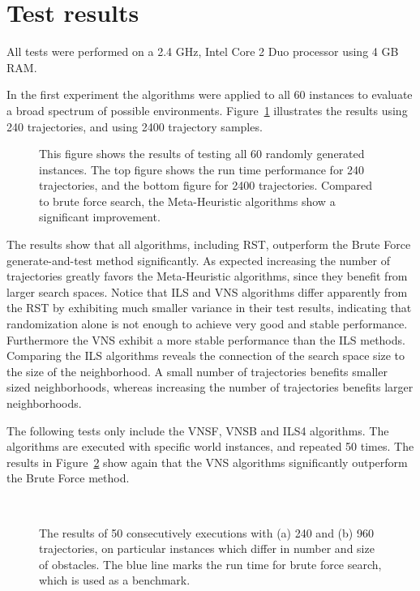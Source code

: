 \section{Test results}\label{sec:testresults}
All tests were performed on a 2.4 GHz, Intel Core 2 Duo processor using 4 GB RAM. 

In the first experiment the algorithms were applied to all 60 instances to evaluate a broad spectrum of possible environments. 
Figure~\ref{fig:fig_allworlds} illustrates the results using 240 trajectories, and using 2400 trajectory samples.
   \begin{figure}[thpb]
        \footnotesize
      \centering
      \def\svgwidth{0.7\textwidth}
      
      \caption{This figure shows the results of testing all 60 randomly generated instances. The top figure shows the run time performance for 240 trajectories, and the bottom figure for 2400 trajectories. Compared to brute force search, the Meta-Heuristic algorithms show a significant improvement. }
      \label{fig:fig_allworlds}
   \end{figure}

 
The results show that all algorithms, including RST, outperform the Brute Force generate-and-test method significantly. 
As expected increasing the number of trajectories greatly favors the Meta-Heuristic algorithms, since they benefit from larger search spaces. 
Notice that ILS and VNS algorithms differ apparently from the RST by exhibiting much smaller variance in their test results, indicating that randomization alone is not enough to achieve very good and stable performance.
Furthermore the VNS exhibit a more stable performance than the ILS methods. 
Comparing the ILS algorithms reveals the connection of the search space size to the size of the neighborhood. 
A small number of trajectories benefits smaller sized neighborhoods, whereas increasing the number of trajectories benefits larger neighborhoods. 

The following tests only include the VNSF, VNSB and ILS4 algorithms. 
The algorithms are executed with specific world instances, and repeated 50 times. 
The results in Figure~\ref{fig:fig_special} show again that the VNS algorithms significantly outperform the Brute Force method. 

\begin{figure}[thb]
   \myfloatalign
    \subfloat[]
    {  
       \def\svgwidth{\textwidth}
       
    }\\
    \subfloat[]
    {  
       \def\svgwidth{\textwidth}
       
    }
    \caption[Experiment: Trajectory size comparison]{The results of 50 consecutively executions with (a) 240 and (b) 960 trajectories, on particular instances which differ in number and size of obstacles. The blue line marks the run time for brute force search, which is used as a benchmark.}  
     \label{fig:fig_special}
\end{figure}
   
